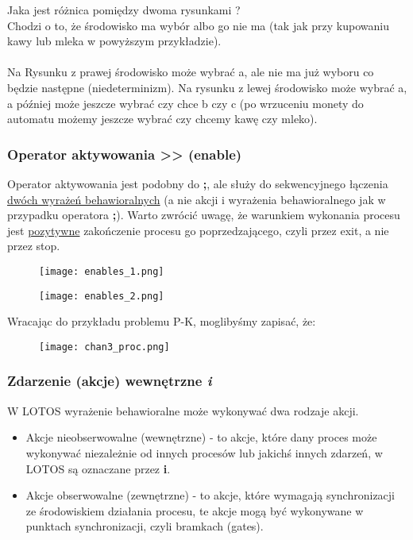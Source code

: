 \documentclass[a4paper,15pt]{article}
\begin{document}
Jaka jest różnica pomiędzy dwoma rysunkami ? \\ Chodzi o to, że środowisko ma wybór albo go nie ma (tak jak przy kupowaniu kawy lub mleka w powyższym przykładzie). \\ \\ Na Rysunku z prawej środowisko może wybrać a, ale nie ma już wyboru co będzie następne (niedeterminizm). Na rysunku z lewej środowisko może wybrać a, a później może jeszcze wybrać czy chce b czy c (po wrzuceniu monety do automatu możemy jeszcze wybrać czy chcemy kawę czy mleko).



\newpage
\subsubsection{Operator aktywowania >> (enable) }
Operator aktywowania jest podobny do \textbf{;}, ale służy do sekwencyjnego łączenia \underline{dwóch wyrażeń behawioralnych} (a nie akcji i wyrażenia behawioralnego jak w przypadku operatora \textbf{;}). Warto zwrócić uwagę, że warunkiem wykonania procesu jest \underline{pozytywne} zakończenie procesu go poprzedzającego, czyli przez exit, a nie przez stop. 
 

\begin{figure}[H]
\centerline{\texttt{[image: enables\_1.png]}}
\label{fig:enables_1}
\end{figure}

\begin{figure}[H]
\centerline{\texttt{[image: enables\_2.png]}}
\label{fig:enables_2}
\end{figure}

\newpage
Wracając do przykładu problemu P-K, moglibyśmy zapisać, że:
\begin{figure}[H]
\centerline{\texttt{[image: chan3\_proc.png]}}
\label{fig:chan3_proc}
\end{figure}





\newpage
\subsubsection{Zdarzenie (akcje) wewnętrzne \textit{i}}


W LOTOS wyrażenie behawioralne może wykonywać dwa rodzaje akcji.
\begin{itemize}
\item Akcje nieobserwowalne (wewnętrzne) - to akcje, które dany proces może wykonywać niezależnie od innych procesów lub jakichś innych zdarzeń, w LOTOS są oznaczane przez \textbf{i}.
\item Akcje obserwowalne (zewnętrzne) - to akcje, które wymagają synchronizacji ze środowiskiem działania procesu, te akcje mogą być wykonywane w punktach synchronizacji, czyli bramkach (gates). 

\end{itemize}
\end{document}

